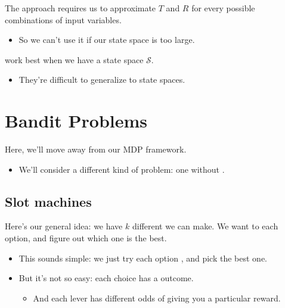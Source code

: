         The approach requires us to approximate $T$ and $R$ for every possible combinations of input variables. 

        \begin{itemize}
            \item So we can't use it if our state space is too large.\\
        \end{itemize}

        \begin{concept}
             work best when we have a  state space $\mathcal{S}$.

            \begin{itemize}
                \item They're difficult to generalize to  state spaces.
            \end{itemize}
        \end{concept}




    \pagebreak

\section{Bandit Problems}

    Here, we'll move away from our MDP framework.
    
    \begin{itemize}
        \item We'll consider a different kind of problem: one without .
    \end{itemize}



    \phantom{}

    \subsection{Slot machines}

        Here's our general idea: we have $k$ different  we can make. We want to  each option, and figure out which one is the best.
    
        \begin{itemize}
            \item This sounds simple: we just try each option , and pick the best one.
    
            \item But it's not so easy: each choice has a  outcome. 
                \begin{itemize}
                    \item And each lever has different odds of giving you a particular reward.
                \end{itemize}
        \end{itemize}
    
